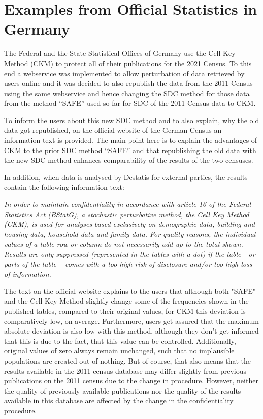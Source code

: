\section{Examples from Official Statistics in Germany}



The Federal and the State Statistical Offices of Germany use the Cell Key Method (CKM) to protect all of their publications for the 2021 Census. To this end a webservice was implemented to allow perturbation of data retrieved by users online and it was decided to also republish the data from the 2011 Census using the same webservice and hence changing the SDC method for those data from the method “SAFE” used so far for SDC of the 2011 Census data to CKM.

To inform the users about this new SDC method and to also explain, why the old data got republished, on the official website of the German Census an information text is provided. The main point here is to explain the advantages of CKM to the prior SDC method “SAFE” and that republishing the old data with the new SDC method enhances comparability of the results of the two censuses.

In addition, when data is analysed by Destatis for external parties, the results contain the following information text:

\begin{mdframed}

\textit{In order to maintain confidentiality in accordance with article 16 of the Federal Statistics Act (BStatG), a stochastic perturbative method, the Cell Key Method (CKM), is used for analyses based exclusively on demographic data, building and housing data, household data and family data. 
For quality reasons, the individual values of a table row or column do not necessarily add up to the total shown.
Results are only suppressed (represented in the tables with a dot) if the table - or parts of the table – comes with a too high risk of disclosure and/or too high loss of information.}

\end{mdframed}


The text on the official website explains to the users that although both "SAFE" and the Cell Key Method slightly change some of the frequencies shown in the published tables, compared to their original values, for CKM this deviation is comparatively low, on average. Furthermore, users get assured that the maximum absolute deviation is also low with this method, although they don’t get informed that this is due to the fact, that this value can be controlled. Additionally, original values of zero always remain unchanged, such that no implausible populations are created out of nothing. But of course, that also means that the results available in the 2011 census database may differ slightly from previous publications on the 2011 census due to the change in procedure. However, neither the quality of previously available publications nor the quality of the results available in this database are affected by the change in the confidentiality procedure.



